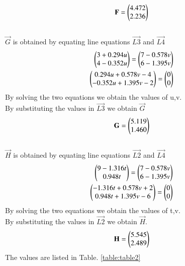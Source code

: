 \begin{enumerate}[label=\thesection.\arabic*.,ref=\thesection.\theenumi]
$$\mathbf{F}=\begin{pmatrix}4.472\\2.236\end{pmatrix}$$
\\
$\vec{G}$ is obtained by equating line equations $\vec{L3}$ and $\vec{L4}$
\begin{align}
\begin{pmatrix}3+0.294u\\4-0.352u\end{pmatrix}=\begin{pmatrix}7-0.578v\\6-1.395v\end{pmatrix}
\\
\begin{pmatrix}0.294u+0.578v-4\\-0.352u+1.395v-2\end{pmatrix}=\begin{pmatrix}0\\0\end{pmatrix}
\end{align}
By solving the two equations we obtain the values of u,v.
\\
By substituting the values in $\vec{L3}$ we obtain $\vec{G}$
\\
$$\mathbf{G}=\begin{pmatrix}5.119\\1.460\end{pmatrix}$$
\\
$\vec{H}$ is obtained by equating line equations $\vec{L2}$ and $\vec{L4}$
\begin{align}
\begin{pmatrix}9-1.316t\\0.948t\end{pmatrix}=\begin{pmatrix}7-0.578v\\6-1.395v\end{pmatrix}
\\
\begin{pmatrix}-1.316t+0.578v+2\\0.948t+1.395v-6\end{pmatrix}=\begin{pmatrix}0\\0\end{pmatrix}
\end{align}
By solving the two equations we obtain the values of t,v.
\\
By substituting the values in $\vec{L2}$ we obtain $\vec{H}$.
\\
$$\mathbf{H}=\begin{pmatrix}5.545\\2.489\end{pmatrix}$$
The values are listed in 
Table. \ref{table:table2} 
\begin{table}[ht!]
\centering

\caption{Cyclic Quadrilateral EFGH}
\label{table:table2}


\end{table}
\end{enumerate}
